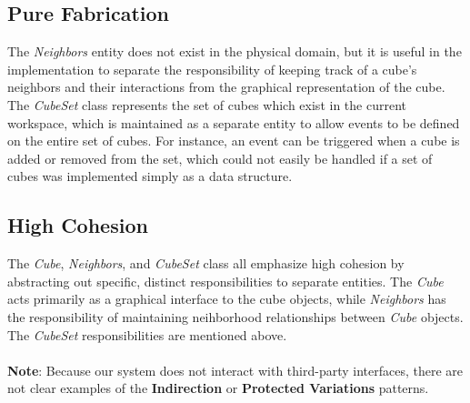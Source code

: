 \documentclass[12pt]{article}
\begin{document}
\subsection{Pure Fabrication}
The \textit{Neighbors} entity does not exist in the physical domain, but it is useful in the implementation to separate the responsibility of keeping track of a cube's neighbors and their interactions from the graphical representation of the cube. The \textit{CubeSet} class represents the set of cubes which exist in the current workspace, which is maintained as a separate entity to allow events to be defined on the entire set of cubes. For instance, an event can be triggered when a cube is added or removed from the set, which could not easily be handled if a set of cubes was implemented simply as a data structure.

\subsection{High Cohesion}
The \textit{Cube}, \textit{Neighbors}, and \textit{CubeSet} class all emphasize high cohesion by abstracting out specific, distinct responsibilities to separate entities. The \textit{Cube} acts primarily as a graphical interface to the cube objects, while \textit{Neighbors} has the responsibility of maintaining neihborhood relationships between \textit{Cube} objects. The \textit{CubeSet} responsibilities are mentioned above.
\\\\
\textbf{Note}: Because our system does not interact with third-party interfaces, there are not clear examples of the \textbf{Indirection} or \textbf{Protected Variations} patterns.
        
\end{document}
